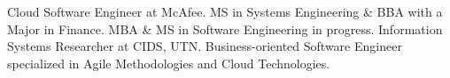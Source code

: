 

\begin{cvparagraph}

Cloud Software Engineer at McAfee. MS in Systems Engineering \& BBA with a Major in Finance. MBA \& MS in Software Engineering in progress. Information Systems Researcher at CIDS, UTN. Business-oriented Software Engineer specialized in Agile Methodologies and Cloud Technologies.
\end{cvparagraph}
